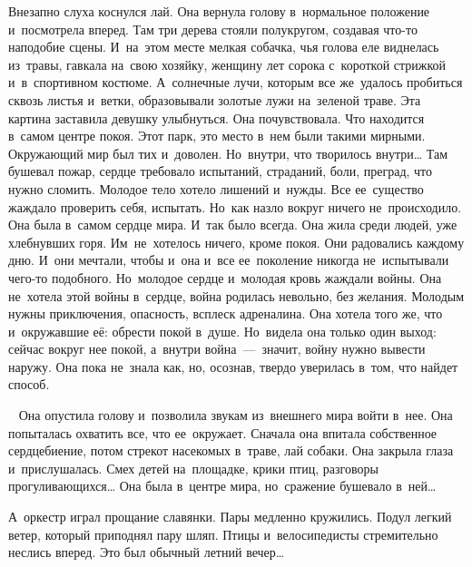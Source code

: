 Внезапно слуха коснулся лай.
Она вернула голову в~нормальное положение и~посмотрела вперед.
Там три дерева стояли полукругом, создавая что-то наподобие сцены.
И~на~этом месте мелкая собачка, чья голова еле виднелась из~травы, гавкала на~свою хозяйку, женщину лет сорока с~короткой стрижкой и~в~спортивном костюме.
А~солнечные лучи, которым все же~удалось пробиться сквозь листья и~ветки, образовывали золотые лужи на~зеленой траве.
Эта картина заставила девушку улыбнуться.
Она почувствовала.
Что находится в~самом центре покоя.
Этот парк, это место в~нем были такими мирными.
Окружающий мир был тих и~доволен.
Но~внутри, что творилось внутри… Там бушевал пожар, сердце требовало испытаний, страданий, боли, преград, что нужно сломить.
Молодое тело хотело лишений и~нужды.
Все ее~существо жаждало проверить себя, испытать.
Но~как назло вокруг ничего не~происходило.
Она была в~самом сердце мира.
И~так было всегда.
Она жила среди людей, уже хлебнувших горя.
Им~не~хотелось ничего, кроме покоя.
Они радовались каждому дню.
И~они мечтали, чтобы и~она и~все ее~поколение никогда не~испытывали чего-то подобного.
Но~молодое сердце и~молодая кровь жаждали войны.
Она не~хотела этой войны в~сердце, война родилась невольно, без желания.
Молодым нужны приключения, опасность, всплеск адреналина.
Она хотела того же, что и~окружавшие её: обрести покой в~душе.
Но~видела она только один выход: сейчас вокруг нее покой, а~внутри война~---~значит, войну нужно вывести наружу.
Она пока не~знала как, но, осознав, твердо уверилась в~том, что найдет способ.

~
Она опустила голову и~позволила звукам из~внешнего мира войти в~нее.
Она попыталась охватить все, что ее~окружает.
Сначала она впитала собственное сердцебиение, потом стрекот насекомых в~траве, лай собаки.
Она закрыла глаза и~прислушалась.
Смех детей на~площадке, крики птиц, разговоры прогуливающихся… Она была в~центре мира, но~сражение бушевало в~ней…
 
А~оркестр играл прощание славянки.
Пары медленно кружились.
Подул легкий ветер, который приподнял пару шляп.
Птицы и~велосипедисты стремительно неслись вперед.
Это был обычный летний вечер… 
